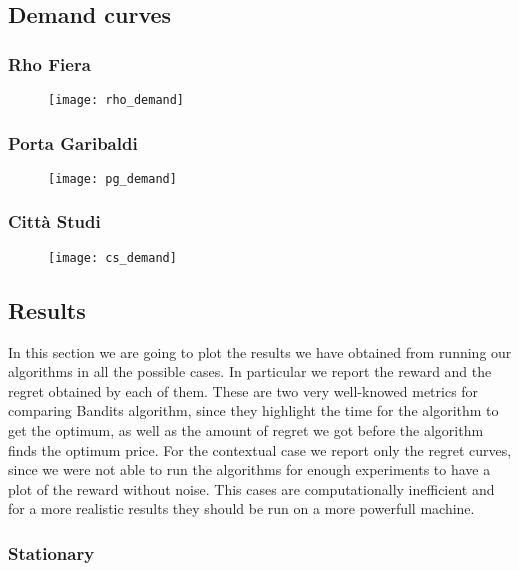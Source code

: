 \subsection{Demand curves}\label{subsec:demand-curves}

\subsubsection{Rho Fiera}

\begin{figure}[H]
	\texttt{[image: rho\_demand]}
\end{figure}

\subsubsection{Porta Garibaldi}

\begin{figure}[H]
	\texttt{[image: pg\_demand]}
\end{figure}

\subsubsection{Città Studi}

\begin{figure}[H]
	\texttt{[image: cs\_demand]}
\end{figure}

\newpage
\subsection{Results}\label{subsec:results}

In this section we are going to plot the results we have obtained from running our algorithms in all the
possible cases. In particular we report the reward and the regret obtained by each of them. These are two very well-knowed
metrics for comparing Bandits algorithm, since they highlight the time for the algorithm to get the optimum, as well as
the amount of regret we got before the algorithm finds the optimum price.
For the contextual case we report only the regret curves, since we were not able to run the algorithms for enough experiments
to have a plot of the reward without noise. This cases are computationally inefficient and for a more realistic results
they should be run on a more powerfull machine.

\subsubsection{Stationary}

